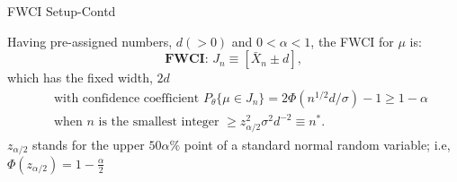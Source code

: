 \documentclass [xcolor=svgnames, t] {beamer}
\begin{document}
    
 \begin{frame}{FWCI Setup-Contd}
  \vspace{5mm}

    
    Having pre-assigned numbers, $d(>0)$ and $0<\alpha<1$, the FWCI for $\mu$ is:
        $$\textbf{FWCI: } J_n \equiv \left[ \bar{X}_n \pm d\right],$$
        which  has the fixed width, $2d$
        \begin{equation} \label{opt_n} 
        \begin{split}
        & \text{ with confidence coefficient }P_{\theta}\{\mu \in J_n\} = 2\Phi(n^{1/2}d/\sigma)-1  \ge 1-\alpha \\
        & \text{ when } n \text{ is the smallest integer } \ge z^2_{\alpha/2}\sigma^2 d^{-2} \equiv n^*.
        \end{split}
        \end{equation}
        $z_{\alpha/2}$ stands for the upper $50 \alpha \%$ point of a standard normal 
        random variable; i.e, $\Phi(z_{\alpha/2})=1-\frac{\alpha}{2}$

\end{frame}
\end{document}
